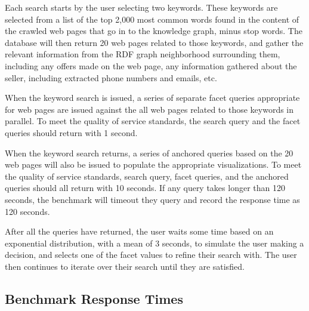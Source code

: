 Each search starts by the user selecting two keywords.  
These keywords are selected from a list of the top 2,000 most common words found in the content of the crawled web pages that go in to the knowledge graph, minus stop words. 
The database will then return 20 web pages related to those keywords, and gather the relevant information from the RDF graph neighborhood surrounding them, including any offers made on the web page, any information gathered about the seller, including extracted phone numbers and emails, etc.  

When the keyword search is issued, a series of separate facet queries appropriate for web pages are issued against the all web pages related to those keywords in parallel.
To meet the quality of service standards, the search query and the facet queries should return with 1 second.

When the keyword search returns, a series of anchored queries based on the 20 web pages will also be issued to populate the appropriate visualizations. 
To meet the quality of service standards, search query, facet queries, and the anchored queries should all return with 10 seconds.  
If any query takes longer than 120 seconds, the benchmark will timeout they query and record the response time as 120 seconds.  

After all the queries have returned, the user waits some time based on an exponential distribution, with a mean of 3 seconds, to simulate the user making a decision, and selects one of the facet values to refine their search with.
The user then continues to iterate over their search until they are satisfied.  

\subsection{Benchmark Response Times}

